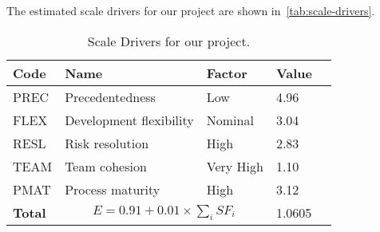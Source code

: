 The estimated scale drivers for our project are shown in~\autoref{tab:scale-drivers}.

\begin{table}[h]
    \centering
    \begin{tabular}{| l | l | l | l | l |}
        \hline
        \textbf{Code}   & \textbf{Name}             & \textbf{Factor}   & \textbf{Value}    \\
        \hline
        PREC            & Precedentedness           & Low               & 4.96                 \\
        \hline
        FLEX            & Development flexibility   & Nominal           & 3.04                 \\
        \hline
        RESL            & Risk resolution           & High              & 2.83                 \\
        \hline
        TEAM            & Team cohesion             & Very High         & 1.10                 \\
        \hline
        PMAT            & Process maturity          & High              & 3.12                 \\
        \hline
        \textbf{Total}  & \multicolumn{2}{|c|}{$E=0.91 + 0.01 \times \sum_{i}SF_i$}    & 1.0605       \\
        \hline
    \end{tabular}
    \caption{Scale Drivers for our project.}
    \label{tab:scale-drivers}
\end{table}
